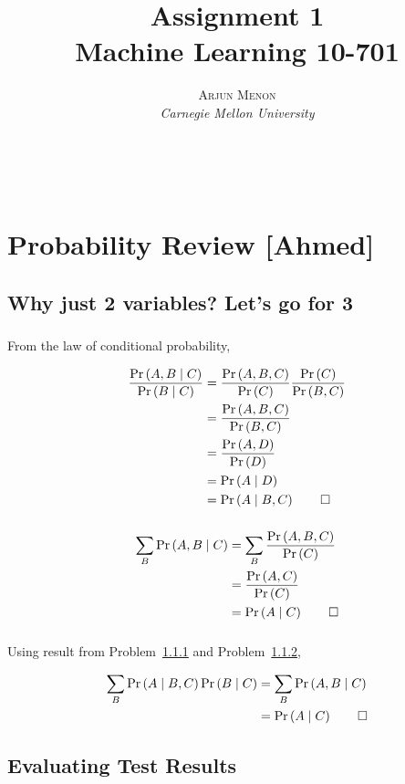 \documentclass[letterpaper,10pt]{article} %
\title{\textbf{Assignment 1}\\ %
Machine Learning 10-701} %
\author{\textsc{Arjun Menon} %
\\{\textit{Carnegie Mellon University}}} %
\makeatletter
\newcommand{\pipe}{\;\middle\vert\;}
\newcommand{\condp}[2]{\Pr\left( #1 \pipe #2 \right)}
\newcommand{\pr}[1]{\Pr\left( #1 \right)}
\newcommand{\condpe}[2]{\frac{\pr{#1,#2}}{\pr{#2}}}
\newcommand{\prove}[1]{
\begin{Proof}
\begin{align*}
#1
\end{align*}
\end{Proof}
}
\renewcommand{\maketitle}{ %
\begin{flushright} %
{\LARGE\@title} %

{\large\@author} %
\\\@date %

\end{flushright}
}
\makeatother
\begin{document}
\maketitle %

\section{Probability Review [Ahmed]}

\subsection{Why just 2 variables? Let's go for 3}

\subsubsection{}\label{subsubsec:1}
From the law of conditional probability,

\prove{
\frac{\condp{A,B}{C}}{\condp{B}{C}} &= \frac{\pr{A,B,C}}{\pr{C}} \frac{\pr{C}}{\pr{B,C}}\\
                                    &= \frac{\pr{A,B,C}}{\pr{B,C}}\\
                                    &= \frac{\pr{A,D}}{\pr{D}}\\
                                    &= \condp{A}{D}\\
                                    &= \condp{A}{B,C} \qedhere
}

\subsubsection{}\label{subsubsec:2}
\prove{
\sum_{B}\condp{A,B}{C} &= \sum_{B}\condpe{A,B}{C}\\
&=\condpe{A}{C}\\
&=\condp{A}{C} \qedhere
}

\subsubsection{}
Using result from Problem~\ref{subsubsec:1} and Problem~\ref{subsubsec:2},
\prove{
\sum_{B}\condp{A}{B,C}\condp{B}{C} &= \sum_{B}\condp{A,B}{C}\\
&= \condp{A}{C} \qedhere
}

\subsection{Evaluating Test Results}
\end{document}
